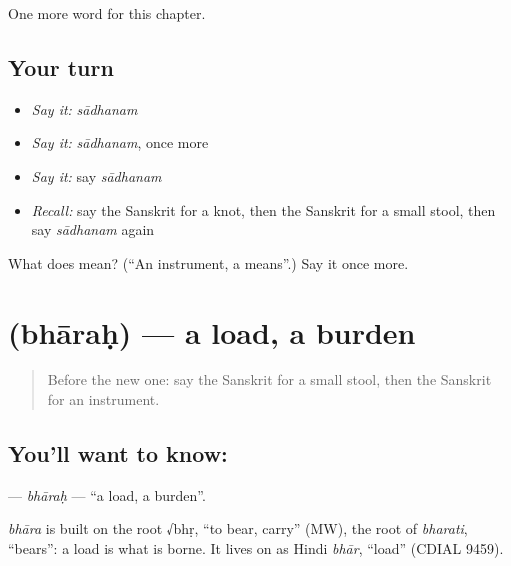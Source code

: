 \begin{grammarlens}[title={What you've built}]
One more word for this chapter.
\end{grammarlens}

\subsection*{Your turn}
\begin{itemize}
\raggedright
  \item \emph{Say it:} \emph{sādhanam}
  \item \emph{Say it:} \emph{sādhanam}, once more
  \item \emph{Say it:} say \emph{sādhanam}
  \item \emph{Recall:} say the Sanskrit for a knot, then the Sanskrit for a small stool, then say \emph{sādhanam} again
\end{itemize}

\begin{tcolorbox}[breakable,colback=teal!4,colframe=teal!35!black,title={Before you move on}]
What does  mean? (\textquotedblleft{}An instrument, a means\textquotedblright{}.) Say it once more.
\end{tcolorbox}
\section[\texorpdfstring{\sk{भारः} (bhāraḥ)}{भारः (bhāraḥ)}]{ (bhāraḥ) — a load, a burden}

\label{lesson:SA-C222-bharah}



\begin{quote}
Before the new one: say the Sanskrit for a small stool, then the Sanskrit for an instrument.
\end{quote}

\subsection*{You'll want to know: }
\textbf{} — \emph{bhāraḥ} — \textquotedblleft{}a load, a burden\textquotedblright{}.

\begin{cousinweb}
\emph{bhāra} is built on the root √bhṛ, \textquotedblleft{}to bear, carry\textquotedblright{} (MW), the root of \emph{bharati}, \textquotedblleft{}bears\textquotedblright{}: a load is what is borne. It lives on as Hindi \emph{bhār}, \textquotedblleft{}load\textquotedblright{} (CDIAL 9459).
\end{cousinweb}

